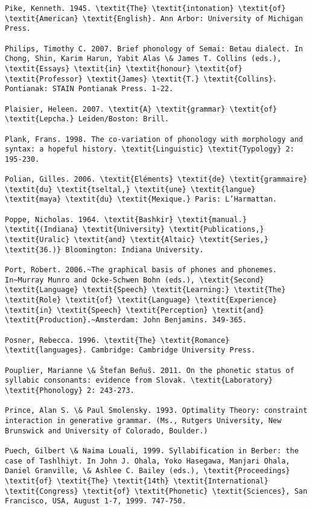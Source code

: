\begin{verbatim}
Pike, Kenneth. 1945. \textit{The} \textit{intonation} \textit{of} \textit{American} \textit{English}. Ann Arbor: University of Michigan Press.

Philips, Timothy C. 2007. Brief phonology of Semai: Betau dialect. In Chong, Shin, Karim Harun, Yabit Alas \& James T. Collins (eds.), \textit{Essays} \textit{in} \textit{honour} \textit{of} \textit{Professor} \textit{James} \textit{T.} \textit{Collins}. Pontianak: STAIN Pontianak Press. 1-22.

Plaisier, Heleen. 2007. \textit{A} \textit{grammar} \textit{of} \textit{Lepcha.} Leiden/Boston: Brill.

Plank, Frans. 1998. The co-variation of phonology with morphology and syntax: a hopeful history. \textit{Linguistic} \textit{Typology} 2: 195-230.

Polian, Gilles. 2006. \textit{Eléments} \textit{de} \textit{grammaire} \textit{du} \textit{tseltal,} \textit{une} \textit{langue} \textit{maya} \textit{du} \textit{Mexique.} Paris: L’Harmattan.

Poppe, Nicholas. 1964. \textit{Bashkir} \textit{manual.} \textit{(Indiana} \textit{University} \textit{Publications,} \textit{Uralic} \textit{and} \textit{Altaic} \textit{Series,} \textit{36.)} Bloomington: Indiana University.

Port, Robert. 2006.~The graphical basis of phones and phonemes. In~Murray Munro and Ocke-Schwen Bohn (eds.), \textit{Second} \textit{Language} \textit{Speech} \textit{Learning:} \textit{The} \textit{Role} \textit{of} \textit{Language} \textit{Experience} \textit{in} \textit{Speech} \textit{Perception} \textit{and} \textit{Production}.~Amsterdam: John Benjamins. 349-365.

Posner, Rebecca. 1996. \textit{The} \textit{Romance} \textit{languages}. Cambridge: Cambridge University Press.

Pouplier, Marianne \& Štefan Beňuš. 2011. On the phonetic status of syllabic consonants: evidence from Slovak. \textit{Laboratory} \textit{Phonology} 2: 243-273.

Prince, Alan S. \& Paul Smolensky. 1993. Optimality Theory: constraint interaction in generative grammar. (Ms., Rutgers University, New Brunswick and University of Colorado, Boulder.)

Puech, Gilbert \& Naima Louali, 1999. Syllabification in Berber: the case of Tashlhiyt. In John J. Ohala, Yoko Hasegawa, Manjari Ohala, Daniel Granville, \& Ashlee C. Bailey (eds.), \textit{Proceedings} \textit{of} \textit{The} \textit{14th} \textit{International} \textit{Congress} \textit{of} \textit{Phonetic} \textit{Sciences}, San Francisco, USA, August 1-7, 1999. 747-750.


\end{verbatim}
